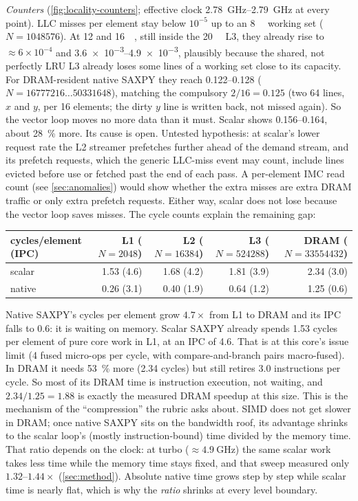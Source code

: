 \emph{Counters} (\cref{fig:locality-counters}; effective clock \qtyrange{2.78}{2.79}{\giga\hertz}
at every point). LLC misses per element stay below $10^{-5}$ up to an \qty{8}{\mebi\byte}
working set ($N=\num{1048576}$). At \num{12} and \qty{16}{\mebi\byte}, still inside the
\qty{20}{\mebi\byte} L3, they already rise to $\approx6\times10^{-4}$ and
\numrange{3.6e-3}{4.9e-3}, plausibly because the shared, not perfectly LRU L3 already loses
some lines of a working set close to its capacity. For DRAM-resident native SAXPY they reach \numrange{0.122}{0.128}
($N=\num{16777216}\ldots\num{50331648}$), matching the compulsory $2/16 = 0.125$ (two
\qty{64}{\byte} lines, $x$ and $y$, per \num{16} elements; the dirty $y$ line is written back, not
missed again). So the vector loop moves no more data than it must. Scalar shows
\numrange{0.156}{0.164}, about \SI{28}{\percent} more. Its cause is open. Untested hypothesis: at
scalar's lower request rate the L2 streamer prefetches further ahead of the demand stream, and its
prefetch requests, which the generic LLC-miss event may count, include lines evicted before use or
fetched past the end of each pass. A per-element IMC read count (see \cref{sec:anomalies}) would
show whether the extra misses are extra DRAM traffic or only extra prefetch requests. Either way, scalar does not lose because
the vector loop saves misses. The cycle counts explain the remaining gap:

\begin{center}\small
  \begin{tabular}{@{}lrrrr@{}}
    \toprule
    cycles/element (IPC) & L1 ($N=\num{2048}$) & L2 ($N=\num{16384}$) & L3 ($N=\num{524288}$) & DRAM ($N=\num{33554432}$) \\
    \midrule
    scalar & 1.53 (4.6) & 1.68 (4.2) & 1.81 (3.9) & 2.34 (3.0) \\
    native & 0.26 (3.1) & 0.40 (1.9) & 0.64 (1.2) & 1.25 (0.6) \\
    \bottomrule
  \end{tabular}
\end{center}

Native SAXPY's cycles per element grow $4.7\times$ from L1 to DRAM and its IPC falls to
\num{0.6}: it is waiting on memory. Scalar SAXPY already spends \num{1.53} cycles per element of
pure core work in L1, at an IPC of \num{4.6}. That is at this core's issue limit (4 fused micro-ops
per cycle, with compare-and-branch pairs macro-fused). In DRAM it needs \SI{53}{\percent} more
(\num{2.34} cycles) but still retires \num{3.0} instructions per cycle. So most of its DRAM time is
instruction execution, not waiting, and $2.34/1.25 = 1.88$ is exactly the measured DRAM speedup at
this size. This is the mechanism of the ``compression'' the rubric asks about. SIMD does not get
slower in DRAM; once native SAXPY sits on the bandwidth roof, its advantage shrinks to the scalar
loop's (mostly instruction-bound) time divided by the memory time. That ratio depends on the clock:
at turbo ($\approx\qty{4.9}{\giga\hertz}$) the same scalar work takes less time while the memory
time stays fixed, and that sweep measured only $1.32\text{--}1.44\times$ (\cref{sec:method}). Absolute native time grows step by step while scalar time is nearly flat,
which is why the \emph{ratio} shrinks at every level boundary.
